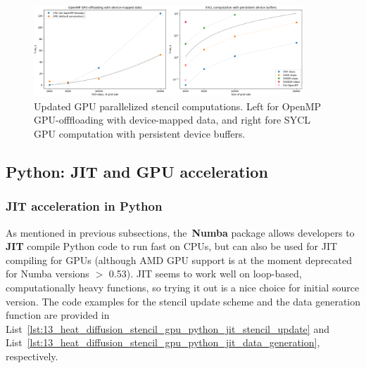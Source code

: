 \begin{figure}[htbp]
\centering\includegraphics[width=0.9\textwidth]{fig_problem/heat_openmp_sycl_update.png}
\caption{Updated GPU parallelized stencil computations. Left for OpenMP GPU-offfloading with device-mapped data, and right fore SYCL GPU computation with persistent device buffers.}\label{fig:heat_openmp_sycl_update}
\end{figure}




\subsection{Python: JIT and GPU acceleration}


\subsubsection{JIT acceleration in Python}


\par
As mentioned in previous subsections, the~\textbf{Numba} package allows developers to \textbf{JIT} compile Python code to run fast on CPUs, but can also be used for JIT compiling for GPUs (although AMD GPU support is at the moment deprecated for Numba versions $>$ 0.53).
JIT seems to work well on loop-based, computationally heavy functions, so trying it out is a nice choice for initial source version.
The code examples for the stencil update scheme and the data generation function are provided in List~\ref{lst:13_heat_diffusion_stencil_gpu_python_jit_stencil_update} and List~\ref{lst:13_heat_diffusion_stencil_gpu_python_jit_data_generation}, respectively.





